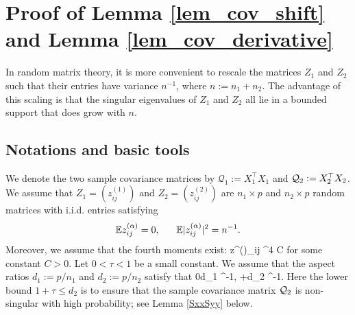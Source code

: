 \section{Proof of Lemma \ref{lem_cov_shift} and Lemma \ref{lem_cov_derivative}} \label{sec_maintools}


In random matrix theory, it is more convenient to rescale the matrices $Z_1$ and $Z_2$ such that their entries have variance $n^{-1}$, where $n:=n_1+n_2$. The advantage of this scaling is that the singular eigenvalues of $Z_1$ and $Z_2$ all lie in a bounded support that does grow with $n$.

\subsection{Notations and basic tools}

We denote the two sample covariance matrices by $\mathcal Q_1:=X_1^\top X_1$ and $\cal Q_2:= X_2^\top X_2$. We assume that $Z_1=(z^{(1)}_{ij})$ and $Z_2=(z^{(2)}_{ij})$ are $n_1\times p$ and $n_2\times p$ random matrices with i.i.d. entries satisfying
\begin{equation}\label{assm1}
\mathbb{E} z^{(\al)}_{ij} =0, \ \quad \ \mathbb{E} \vert z^{(\al)}_{ij} \vert^2  =n^{-1}. 
\end{equation}
Moreover, we assume that the fourth moments exist:
\be \label{conditionA2}
 \vert {}z^{(\al)}_{ij} \vert^4  \le C
\ee
for some constant $C>0$. Let $0<\tau<1$ be a small constant. 
We assume that the aspect ratios $d_1:= p/n_1$ and $d_2:=p/n_2$ satisfy that 
\be\label{assm2}
0\le d_1 \le \tau^{-1}, +\tau \le d_{2} \le \tau^{-1}.
\ee
Here the lower bound $1+\tau\le d_2$ is to ensure that the sample covariance matrix $\cal Q_2$ is non-singular with high probability; see Lemma \ref{SxxSyy} below. 

